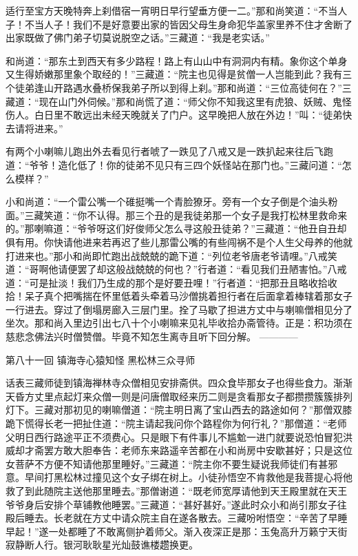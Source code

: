 \documentclass[12pt,UTF8]{ctexbook}
\begin{document}
{	适行至宝方天晚特奔上刹借宿一宵明日早行望垂方便一二。”那和尚笑道：“不当人子！不当人子！我们不是好意要出家的皆因父母生身命犯华盖家里养不住才舍断了出家既做了佛门弟子切莫说脱空之话。”三藏道：“我是老实话。”
	
	和尚道：“那东土到西天有多少路程！路上有山山中有洞洞内有精。象你这个单身又生得娇嫩那里象个取经的！”三藏道：“院主也见得是贫僧一人岂能到此？我有三个徒弟逢山开路遇水叠桥保我弟子所以到得上刹。”那和尚道：“三位高徒何在？”三藏道：“现在山门外伺候。”那和尚慌了道：“师父你不知我这里有虎狼、妖贼、鬼怪伤人。白日里不敢远出未经天晚就关了门户。这早晚把人放在外边！”叫：“徒弟快去请将进来。”
	
	有两个小喇嘛儿跑出外去看见行者唬了一跌见了八戒又是一跌扒起来往后飞跑道：“爷爷！造化低了！你的徒弟不见只有三四个妖怪站在那门也。”三藏问道：“怎么模样？”
	
	小和尚道：“一个雷公嘴一个碓挺嘴一个青脸獠牙。旁有一个女子倒是个油头粉面。”三藏笑道：“你不认得。那三个丑的是我徒弟那一个女子是我打松林里救命来的。”那喇嘛道：“爷爷呀这们好俊师父怎么寻这般丑徒弟？”三藏道：“他丑自丑却俱有用。你快请他进来若再迟了些儿那雷公嘴的有些闯祸不是个人生父母养的他就打进来也。”那小和尚即忙跑出战兢兢的跪下道：“列位老爷唐老爷请哩。”八戒笑道：“哥啊他请便罢了却这般战兢兢的何也？”行者道：“看见我们丑陋害怕。”八戒道：“可是扯淡！我们乃生成的那个是好要丑哩！”行者道：“把那丑且略收拾收拾！呆子真个把嘴揣在怀里低着头牵着马沙僧挑着担行者在后面拿着棒辖着那女子一行进去。穿过了倒塌房廊入三层门里。拴了马歇了担进方丈中与喇嘛僧相见分了坐次。那和尚入里边引出七八十个小喇嘛来见礼毕收拾办斋管待。正是：积功须在慈悲念佛法兴时僧赞僧。毕竟不知怎生离寺且听下回分解。
	------------
	
	第八十一回 镇海寺心猿知怪 黑松林三众寻师
	
	话表三藏师徒到镇海禅林寺众僧相见安排斋供。四众食毕那女子也得些食力。渐渐天昏方丈里点起灯来众僧一则是问唐僧取经来历二则是贪看那女子都攒攒簇簇排列灯下。三藏对那初见的喇嘛僧道：“院主明日离了宝山西去的路途如何？”那僧双膝跪下慌得长老一把扯住道：“院主请起我问你个路程你为何行礼？”那僧道：“老师父明日西行路途平正不须费心。只是眼下有件事儿不尴魀一进门就要说恐怕冒犯洪威却才斋罢方敢大胆奉告：老师东来路遥辛苦都在小和尚房中安歇甚好；只是这位女菩萨不方便不知请他那里睡好。”三藏道：“院主你不要生疑说我师徒们有甚邪意。早间打黑松林过撞见这个女子绑在树上。小徒孙悟空不肯救他是我菩提心将他救了到此随院主送他那里睡去。”那僧谢道：“既老师宽厚请他到天王殿里就在天王爷爷身后安排个草铺教他睡罢。”三藏道：“甚好甚好。”遂此时众小和尚引那女子往殿后睡去。长老就在方丈中请众院主自在遂各散去。三藏吩咐悟空：“辛苦了早睡早起！”遂一处都睡了不敢离侧护着师父。渐入夜深正是那：玉兔高升万籁宁天街寂静断人行。银河耿耿星光灿鼓谯楼趱换更。
	
}
\end{document}

